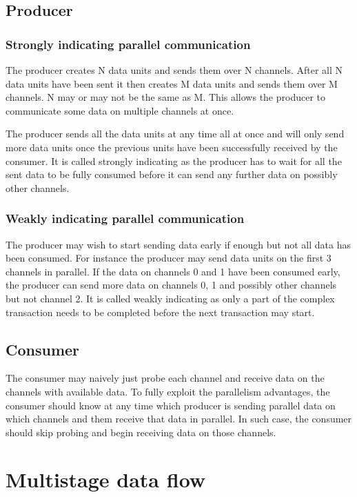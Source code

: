 \documentclass{report}
\begin{document}
\subsection{Producer}

\subsubsection{Strongly indicating parallel communication}

The producer creates N data units and sends them over N channels. After all N
data units have been sent it then creates M data units and sends them over M
channels. N may or may not be the same as M. This allows the producer to
communicate some data on multiple channels at once.

The producer sends all the data units at any time all at once and will only send
more data units once the previous units have been successfully received by the
consumer. It is called strongly indicating as the producer has to wait for all
the sent data to be fully consumed before it can send any further data on
possibly other channels.

\subsubsection{Weakly indicating parallel communication}

The producer may wish to start sending data early if enough but not all data has
been consumed. For instance the producer may send data units on the first 3
channels in parallel. If the data on channels 0 and 1 have been consumed early,
the producer can send more data on channels 0, 1 and possibly other channels but
not channel 2. It is called weakly indicating as only a part of the complex
transaction needs to be completed before the next transaction may start.

\subsection{Consumer}

The consumer may naively just probe each channel and receive data on the
channels with available data. To fully exploit the parallelism advantages, the
consumer should know at any time which producer is sending parallel data on
which channels and them receive that data in parallel. In such case, the
consumer should skip probing and begin receiving data on those channels.

\section{Multistage data flow}
\end{document}
